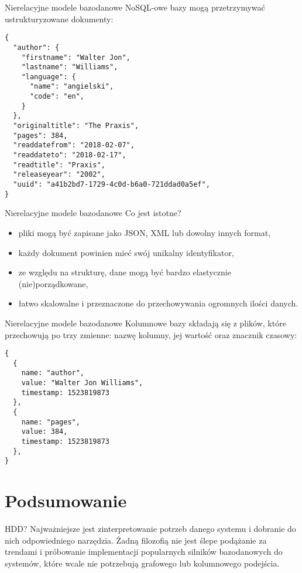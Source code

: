 \begin{frame}[fragile]{Nierelacyjne modele bazodanowe}
	NoSQL-owe bazy mogą przetrzymywać ustrukturyzowane dokumenty:

	\begin{lstlisting}
{
  "author": {
    "firstname": "Walter Jon",
    "lastname": "Williams",
    "language": {
      "name": "angielski",
      "code": "en",
    }
  },
  "originaltitle": "The Praxis",
  "pages": 384,
  "readdatefrom": "2018-02-07",
  "readdateto": "2018-02-17",
  "readtitle": "Praxis",
  "releaseyear": "2002",
  "uuid": "a41b2bd7-1729-4c0d-b6a0-721ddad0a5ef",
}
	\end{lstlisting}
\end{frame}

\begin{frame}[fragile]{Nierelacyjne modele bazodanowe}
	Co jest istotne?
	\begin{itemize}
		\item pliki mogą być zapisane jako JSON, XML lub dowolny innych format,
		\item każdy dokument powinien mieć swój unikalny identyfikator,
		\item ze względu na strukturę, dane mogą być bardzo elastycznie (nie)porządkowane,
		\item łatwo skalowalne i przeznaczone do przechowywania ogromnych ilości danych.
	\end{itemize}
\end{frame}

\begin{frame}[fragile]{Nierelacyjne modele bazodanowe}
	Kolumnowe bazy składają się z plików, które przechowują po trzy zmienne: nazwę kolumny, jej wartość oraz znacznik czasowy:

	\begin{lstlisting}
{
  {
    name: "author",
    value: "Walter Jon Williams",
    timestamp: 1523819873
  },
  {
    name: "pages",
    value: 384,
    timestamp: 1523819873
  },
}
	\end{lstlisting}
\end{frame}

\section{Podsumowanie}

\begin{frame}[fragile]{HDD?}
	Najważniejsze jest zinterpretowanie potrzeb danego systemu i dobranie do nich odpowiedniego narzędzia. Żadną filozofią nie jest ślepe podążanie za trendami i próbowanie implementacji popularnych silników bazodanowych do systemów, które wcale nie potrzebują grafowego lub kolumnowego podejścia.
\end{frame}

